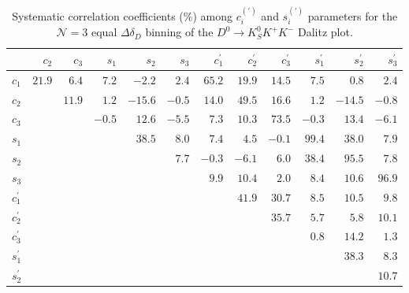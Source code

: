 \documentclass[aps,prd,superscriptaddress,nopreprintnumbers,nofootinbib,showpacs,floatfix]{revtex4}
\begin{document}
\begin{table}[htb]
\caption{Systematic correlation coefficients (\%) among $c^{(\prime)}_{i}$ and $s^{(\prime)}_{i}$ parameters for %
the $\mathcal{N}=3$ equal $\Delta\delta_D$ binning of the $D^{0}\to K^{0}_{S}K^{+}K^{-}$ Dalitz %
plot.}\label{tab:corr_K0SKK_3bin_syst}
\begin{center} 
\begin{tabular}{lrrrrrrrrrrr} \hline\hline
                & $c_2 $ & $c_3$ & $s_1$ & $s_2$ & $s_3$ & $c^{\prime}_1$ & $c^{\prime}_2$ & $c^{\prime}_3$ & %
$s^{\prime}_1$ & $s^{\prime}_2$ & $s^{\prime}_3$ \\ \hline 
$c_1$           & $  21.9 $  & $  6.4 $   & $  7.2 $   & $ -2.2 $   & $  2.4 $   & $  65.2 $  & $  19.9 $  & $  %
14.5 $  & $  7.5 $   & $  0.8 $   & $  2.4 $ \\ 
$c_2$           &            & $  11.9 $  & $  1.2 $   & $ -15.6 $  & $ -0.5 $   & $  14.0 $  & $  49.5 $  & $  %
16.6 $  & $  1.2 $   & $ -14.5 $  & $ -0.8 $ \\ 
$c_3$           &            &            & $ -0.5 $   & $  12.6 $  & $ -5.5 $   & $  7.3 $   & $  10.3 $  & $  %
73.5 $  & $ -0.3 $   & $  13.4 $  & $ -6.1 $ \\ 
$s_1$           &            &            &            & $  38.5 $  & $  8.0 $   & $  7.4 $   & $  4.5 $   & $ -0.1 %
$   & $  99.4 $  & $  38.0 $  & $  7.9 $ \\ 
$s_2$           &            &            &            &            & $  7.7 $   & $ -0.3 $   & $ -6.1 $   & $  6.0 %
$   & $  38.4 $  & $  95.5 $  & $  7.8 $ \\ 
$s_3$           &            &            &            &            &            & $  9.9 $   & $  10.4 $  & $  2.0 %
$   & $  8.4 $   & $  10.6 $  & $  96.9 $ \\
$c^{\prime}_1$  &            &            &            &            &            &            & $  41.9 $  & $  %
30.7 $  & $  8.5 $   & $  10.5 $  & $  9.8 $ \\ 
$c^{\prime}_2$  &            &            &            &            &            &            &            & $  %
35.7 $  & $  5.7 $   & $  5.8 $   & $  10.1 $ \\
$c^{\prime}_3$  &            &            &            &            &            &            &            &            %
& $  0.8 $   & $  14.2 $  & $  1.3 $ \\ 
$s^{\prime}_1$  &            &            &            &            &            &            &            &            %
&            & $  38.3 $  & $  8.3 $ \\ 
$s^{\prime}_2$  &            &            &            &            &            &            &            &            %
&            &            & $  10.7 $ \\
\hline\hline
\end{tabular}
\end{center}
\end{table}
\end{document}
